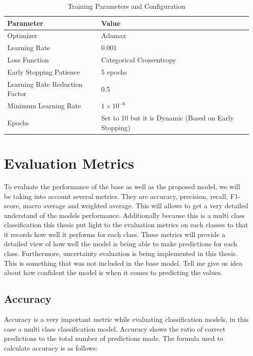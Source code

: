 \documentclass[12pt,onecolumn]{report}
\begin{document}
\begin{table}[h]
    \centering
    \caption{Training Parameters and Configuration}
    \label{tab:training_parameters}
    \begin{tabular}{|l|l|}
        \hline
        \textbf{Parameter} & \textbf{Value} \\
        \hline
        Optimizer          & Adamax \\
        Learning Rate      & 0.001 \\
        Loss Function      & Categorical Crossentropy \\
        Early Stopping Patience & 5 epochs \\
        Learning Rate Reduction Factor & 0.5 \\
        Minimum Learning Rate & \(1 \times 10^{-6}\) \\
        Epochs             & Set to 10 but it is Dynamic (Based on Early Stopping) \\
        \hline
    \end{tabular}
\end{table}

\section{Evaluation Metrics}

To evaluate the performance of the base as well as the proposed model, we will be taking into account several metrics. They are  accuracy, precision, recall, F1-score, macro average and weighted average. This will allows to get a very detailed understand of the models performance. Additionally because this is a multi class classification this thesis put light to the evaluation metrics on each classes to that it records how well it performs for each class. These metrics will provide a detailed view of how well the model is being able to make predictions for each class. Furthermore, uncertainty evaluation is being implemented in this thesis. This is something that was not included in the base model. Tell me give us idea about how confident the model is when it comes to predicting the values.

\subsection{Accuracy}
Accuracy is a very important metric while evaluating classification models, in this case a multi class classification model. Accuracy shows the ratio of correct predictions to the total number of predictions made. The formula used to calculate accuracy is as follows:
\end{document}
